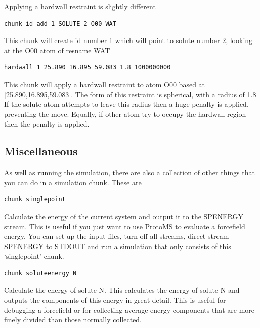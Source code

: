\documentclass[letterpaper,10pt,english]{sphinxmanual}
\begin{document}
Applying a hardwall restraint is slightly different

\begin{Verbatim}[commandchars=\\\{\}]
chunk id add 1 SOLUTE 2 O00 WAT
\end{Verbatim}

This chunk will create id number 1 which will point to solute number 2, looking at the O00 atom of resname WAT

\begin{Verbatim}[commandchars=\\\{\}]
hardwall 1 25.890 16.895 59.083 1.8 1000000000
\end{Verbatim}

This chunk will apply a hardwall restraint to atom O00 based at {[}25.890,16.895,59.083{]}. The form of this restraint is spherical, with a radius of 1.8 If the solute atom attempts to leave this radius then a huge penalty is applied, preventing the move. Equally, if other atom try to occupy the hardwall region then the penalty is applied.


\subsection{Miscellaneous}
\label{protoms:miscellaneous}\label{protoms:misccmd}
As well as running the simulation, there are also a collection of other things that you can do in a simulation chunk. These are

\begin{Verbatim}[commandchars=\\\{\}]
chunk singlepoint
\end{Verbatim}

Calculate the energy of the current system and output it to the SPENERGY stream. This is useful if you just want to use ProtoMS to evaluate a forcefield energy. You can set up the input files, turn off all streams, direct stream SPENERGY to STDOUT and run a simulation that only consists of this ‘singlepoint’ chunk.

\begin{Verbatim}[commandchars=\\\{\}]
chunk soluteenergy N
\end{Verbatim}

Calculate the energy of solute N. This calculates the energy of solute N and outputs the components of this energy in great detail. This is useful for debugging a forcefield or for collecting average energy components that are more finely divided than those normally collected.
\end{document}
